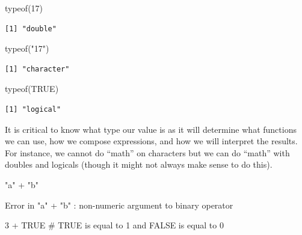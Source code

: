 \documentclass[
  letterpaper,
  DIV=11,
  numbers=noendperiod]{scrreprt}
\newenvironment{Shaded}{\begin{snugshade}}{\end{snugshade}}
\newcommand{\CommentTok}[1]{\textcolor[rgb]{0.37,0.37,0.37}{#1}}
\newcommand{\ConstantTok}[1]{\textcolor[rgb]{0.56,0.35,0.01}{#1}}
\newcommand{\DecValTok}[1]{\textcolor[rgb]{0.68,0.00,0.00}{#1}}
\newcommand{\FunctionTok}[1]{\textcolor[rgb]{0.28,0.35,0.67}{#1}}
\newcommand{\NormalTok}[1]{\textcolor[rgb]{0.00,0.23,0.31}{#1}}
\newcommand{\SpecialCharTok}[1]{\textcolor[rgb]{0.37,0.37,0.37}{#1}}
\newcommand{\StringTok}[1]{\textcolor[rgb]{0.13,0.47,0.30}{#1}}
\begin{document}
\begin{Shaded}
\begin{Highlighting}[]
\FunctionTok{typeof}\NormalTok{(}\DecValTok{17}\NormalTok{)}
\end{Highlighting}
\end{Shaded}

\begin{verbatim}
[1] "double"
\end{verbatim}

\begin{Shaded}
\begin{Highlighting}[]
\FunctionTok{typeof}\NormalTok{(}\StringTok{"17"}\NormalTok{)}
\end{Highlighting}
\end{Shaded}

\begin{verbatim}
[1] "character"
\end{verbatim}

\begin{Shaded}
\begin{Highlighting}[]
\FunctionTok{typeof}\NormalTok{(}\ConstantTok{TRUE}\NormalTok{)}
\end{Highlighting}
\end{Shaded}

\begin{verbatim}
[1] "logical"
\end{verbatim}

It is critical to know what type our value is as it will determine what
functions we can use, how we compose expressions, and how we will
interpret the results. For instance, we cannot do ``math'' on characters
but we can do ``math'' with doubles and logicals (though it might not
always make sense to do this).

\begin{Shaded}
\begin{Highlighting}[]
\StringTok{"a"} \SpecialCharTok{+} \StringTok{"b"}
\end{Highlighting}
\end{Shaded}

{Error in "a" + "b" : non-numeric argument to binary operator}

\begin{Shaded}
\begin{Highlighting}[]
\DecValTok{3} \SpecialCharTok{+} \ConstantTok{TRUE} \CommentTok{\# TRUE is equal to 1 and FALSE is equal to 0}
\end{Highlighting}
\end{Shaded}
\end{document}
